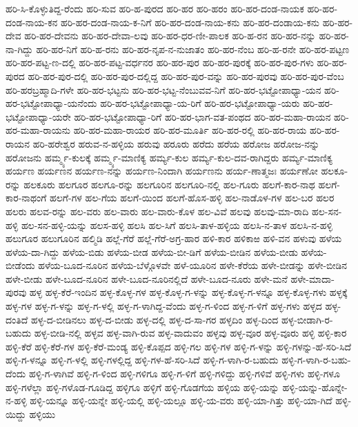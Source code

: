 ಹರಿ-ಸಿ-ಕೊಳ್ಳುತಿದ್ದ-ರೆಂದು
ಹರಿ-ಸುವ
ಹರಿ-ಹ-ಪುರದ
ಹರಿ-ಹರ
ಹರಿ-ಹರಂ
ಹರಿ-ಹರ-ದಂಡ-ನಾಯಕ
ಹರಿ-ಹರ-ದಂಡ-ನಾಯ-ಕನ
ಹರಿ-ಹರ-ದಂಡ-ನಾಯ-ಕ-ನಿಗೆ
ಹರಿ-ಹರ-ದಂಡ-ನಾಯ-ಕನು
ಹರಿ-ಹರ-ದಂಡಾಯ-ಕನು
ಹರಿ-ಹರ-ದೇವ
ಹರಿ-ಹರ-ದೇವನು
ಹರಿ-ಹರ-ದೇವಾ-ಲವು
ಹರಿ-ಹರ-ಧರ-ಣೀ-ಪಾಲಕ
ಹರಿ-ಹ-ರನ
ಹರಿ-ಹರ-ನನ್ನು
ಹರಿ-ಹರ-ನಾ-ಗಿದ್ದು
ಹರಿ-ಹರ-ನಿಗೆ
ಹರಿ-ಹ-ರನು
ಹರಿ-ಹರ-ನೃಪ-ನ-ನುಜಾತಂ
ಹರಿ-ಹರ-ನೆಂಬ
ಹರಿ-ಹ-ರನೇ
ಹರಿ-ಹರ-ಪಟ್ಟಣ
ಹರಿ-ಹರ-ಪಟ್ಟ-ಣ-ದಲ್ಲಿ
ಹರಿ-ಹರ-ಪಟ್ಟ-ವರ್ಧನರ
ಹರಿ-ಹರ-ಪುರ
ಹರಿ-ಹರ-ಪುರಕ್ಕೆ
ಹರಿ-ಹರ-ಪುರ-ಗಳು
ಹರಿ-ಹರ-ಪುರದ
ಹರಿ-ಹರ-ಪುರ-ದಲ್ಲಿ
ಹರಿ-ಹರ-ಪುರ-ದಲ್ಲಿದ್ದ
ಹರಿ-ಹರ-ಪುರ-ವನ್ನು
ಹರಿ-ಹರ-ಪುರವು
ಹರಿ-ಹರ-ಪುರ-ವೆಂಬ
ಹರಿ-ಹರಬ್ರಹ್ಮಾದಿ-ಗಳೇ
ಹರಿ-ಹರ-ಭಟ್ಟನು
ಹರಿ-ಹರ-ಭಟ್ಟ-ನೆಂಬುವವ-ನಿಗೆ
ಹರಿ-ಹರ-ಭಟ್ಟೋಪಾಧ್ಯಾ-ಯನ
ಹರಿ-ಹರ-ಭಟ್ಟೋಪಾಧ್ಯಾ-ಯನೆಂದು
ಹರಿ-ಹರ-ಭಟ್ಟೋಪಾಧ್ಯಾ-ಯ-ರಿಗೆ
ಹರಿ-ಹರ-ಭಟ್ಟೋಪಾಧ್ಯಾ-ಯರು
ಹರಿ-ಹರ-ಭಟ್ಟೋಪಾಧ್ಯಾ-ಯರೇ
ಹರಿ-ಹರ-ಭಟ್ಟೋಪಾಧ್ಯಾ-ರಿಗೆ
ಹರಿ-ಹರ-ಭಾಗ-ವತ-ಪಂಥದ
ಹರಿ-ಹರ-ಮಹಾ-ರಾಯನ
ಹರಿ-ಹರ-ಮಹಾ-ರಾಯನು
ಹರಿ-ಹರ-ಮಹಾ-ರಾಯರ
ಹರಿ-ಹರ-ಮೂರ್ತಿ
ಹರಿ-ಹರ-ರಲ್ಲಿ
ಹರಿ-ಹರ-ರಾಯ
ಹರಿ-ಹರ-ರಾಯನ
ಹರಿ-ಹರೇಶ್ವರ
ಹರುವ-ನ-ಹಳ್ಳಿಯ
ಹರುವು
ಹರೂರು
ಹರೆದು
ಹರೆಯ
ಹರೋಜ
ಹರೋಜ-ನನ್ನು
ಹರೋಜನು
ಹರ್ಮ್ಮ್ಯ-ಕುಲಕ್ಕೆ
ಹರ್ಮ್ಮ್ಯ-ಮಾಣಿಕ್ಯ
ಹರ್ಮ್ಯ-ಕುಲ
ಹರ್ಮ್ಯ-ಕುಲ-ದವ-ರಾಗಿದ್ದರು
ಹರ್ಮ್ಯ-ಮಾಣಿಕ್ಯ
ಹರ್ಯಣ
ಹರ್ಯಣನ
ಹರ್ಯಣ-ನನ್ನು
ಹರ್ಯಣ-ನಿಂದಾಗಿ
ಹರ್ಯಣನು
ಹರ್ಯ-ಣಾತ್ಮಜಃ
ಹರ್ಯಣೋ
ಹಲಕೂ-ರನ್ನು
ಹಲಕೂರು
ಹಲಗೂರ
ಹಲಗೂ-ರನ್ನು
ಹಲಗೂರಿನ
ಹಲಗೂರಿ-ನಲ್ಲಿ
ಹಲ-ಗೂರು
ಹಲಗೆ-ಕಾರ-ನಾಥ
ಹಲಗೆ-ಕಾರ-ನಾಥಂಗೆ
ಹಲಗೆ-ಗಳ
ಹಲ-ಗೆಯ
ಹಲಗೆ-ಯಿಂದ
ಹಲಗೆ-ಹೊಸ-ಹಳ್ಳಿ
ಹಲ-ನಾಡೊಳ-ಗಳ
ಹಲ-ಬರ
ಹಲರ
ಹಲರು
ಹಲವ-ರನ್ನು
ಹಲ-ವರು
ಹಲ-ವಾರು
ಹಲ-ವಾರು-ಕೊಳ
ಹಲ-ವಿವೆ
ಹಲವು
ಹಲವು-ಮಾ-ರಾದಿ
ಹಲ-ಸನ-ಹಳ್ಳಿ
ಹಲ-ಸನ-ಹಳ್ಳಿ-ಯನ್ನು
ಹಲಸ-ಹಳ್ಳಿ
ಹಲಸಿ
ಹಲ-ಸಿಗೆ
ಹಲಸಿ-ತಾಳ-ಹಳ್ಳಿಯ
ಹಲಸಿ-ನ-ತಾಳ
ಹಲಸಿ-ನ-ಹಳ್ಳಿ
ಹಲುಗೂರ
ಹಲುಗೂರಿನ
ಹಲ್ಮಿಡಿ
ಹಲ್ಲೆ-ಗೆರೆ
ಹಲ್ಲೆ-ಗೆರೆ-ಅಗ್ರ-ಹಾರ
ಹಳಿ-ಕಾರ
ಹಳಿಕಾಱ
ಹಳಿ-ವನ
ಹಳುವು
ಹಳೆಯ
ಹಳೆಯ-ದಾ-ಗಿದ್ದು
ಹಳೆಯ-ಬಿಡು
ಹಳೆಯ-ಬೀಡ
ಹಳೆಯ-ಬೀ-ಡಿಗೆ
ಹಳೆಯ-ಬೀಡಿನ
ಹಳೆಯ-ಬೀಡು
ಹಳೆಯ-ಬೀಡೆಂದು
ಹಳೆಯ-ಬೂದ-ನೂರಿನ
ಹಳೆಯ-ಬೆಳ್ಗೊಳವೇ
ಹಳೆ-ಯೂರಿನ
ಹಳೇ-ಕೆರೆಯ
ಹಳೇ-ಬೀಡನ್ನು
ಹಳೇ-ಬೀಡಿನ
ಹಳೇ-ಬೀಡು
ಹಳೇ-ಬೂದ-ನೂರಿನ
ಹಳೇ-ಬೂದ-ನೂರಿನಲ್ಲಿದೆ
ಹಳೇ-ಬೂದ-ನೂರು
ಹಳೇ-ಮನೆ
ಹಳೇ-ಮಾದಾ-ಪುರವು
ಹಳ್ಳ
ಹಳ್ಳ-ಕೆರೆ-ಇಂದಿನ
ಹಳ್ಳ-ಕೊಳ್ಳ-ಗಳ
ಹಳ್ಳ-ಕೊಳ್ಳ-ಗ-ಳನ್ನು
ಹಳ್ಳ-ಕೊಳ್ಳ-ಗ-ಳನ್ನೂ
ಹಳ್ಳ-ಕೊಳ್ಳ-ಗಳು
ಹಳ್ಳಕ್ಕೆ
ಹಳ್ಳ-ಗಳ
ಹಳ್ಳ-ಗ-ಳನ್ನು
ಹಳ್ಳ-ಗ-ಳಲ್ಲಿ
ಹಳ್ಳ-ಗ-ಳಾಗಿದ್ದ-ವೆಂದು
ಹಳ್ಳ-ಗ-ಳಿಂದ
ಹಳ್ಳ-ಗ-ಳಿಗೆ
ಹಳ್ಳ-ಗಳು
ಹಳ್ಳದ
ಹಳ್ಳ-ದಂತಿದೆ
ಹಳ್ಳ-ದ-ಬೀಡಿನಲು
ಹಳ್ಳ-ದ-ಬೀಡು
ಹಳ್ಳ-ದಲ್ಲಿ
ಹಳ್ಳ-ದ-ಸಾ-ಗರ
ಹಳ್ಳದಿಂ
ಹಳ್ಳ-ದಿಂದ
ಹಳ್ಳ-ಬೀಡಾಗಿ-ರ-ಬಹುದು
ಹಳ್ಳ-ಬೀಡಿ-ನಲ್ಲಿ
ಹಳ್ಳವ
ಹಳ್ಳ-ವಾಗಿ-ರುವ
ಹಳ್ಳ-ವಾದುವಂ
ಹಳ್ಳವು
ಹಳ್ಳ-ವೂರ
ಹಳ್ಳ-ವೂರು
ಹಳ್ಳಿ
ಹಳ್ಳಿ-ಕಾರ
ಹಳ್ಳಿ-ಕೆರೆ
ಹಳ್ಳಿ-ಕೆರೆ-ಗಳ
ಹಳ್ಳಿ-ಕೆರೆ-ಮಂಡ್ಯ
ಹಳ್ಳಿ-ಕೊಪ್ಪದ
ಹಳ್ಳಿ-ಗಲ
ಹಳ್ಳಿ-ಗಳ
ಹಳ್ಳಿ-ಗ-ಳನ್ನು
ಹಳ್ಳಿ-ಗಳನ್ನು-ಹೆ-ಸರಿ-ಸಿದೆ
ಹಳ್ಳಿ-ಗ-ಳನ್ನೂ
ಹಳ್ಳಿ-ಗ-ಳಲ್ಲಿ
ಹಳ್ಳಿ-ಗಳಲ್ಲಿದ್ದ
ಹಳ್ಳಿ-ಗಳ-ಹೆ-ಸರಿ-ಸಿದೆ
ಹಳ್ಳಿ-ಗ-ಳಾಗಿ-ರ-ಬಹುದು
ಹಳ್ಳಿ-ಗ-ಳಾಗಿ-ರ-ಬಹು-ದೆಂದು
ಹಳ್ಳಿ-ಗ-ಳಾಗಿವೆ
ಹಳ್ಳಿ-ಗ-ಳಿಂದ
ಹಳ್ಳಿ-ಗಳಿಗೂ
ಹಳ್ಳಿ-ಗ-ಳಿಗೆ
ಹಳ್ಳಿ-ಗಳಿದ್ದು
ಹಳ್ಳಿ-ಗಳಿವೆ
ಹಳ್ಳಿ-ಗಳು
ಹಳ್ಳಿ-ಗಳೂ
ಹಳ್ಳಿ-ಗಳೆಲ್ಲಾ
ಹಳ್ಳಿ-ಗಳೊಡ-ಗೂಡಿದ್ದ
ಹಳ್ಳಿಗೂ
ಹಳ್ಳಿಗೆ
ಹಳ್ಳಿ-ಗೊಡಗೆಯ
ಹಳ್ಳಿಯ
ಹಳ್ಳಿ-ಯನ್ನು
ಹಳ್ಳಿ-ಯನ್ನು-ಹೊನ್ನೇ-ನ-ಹಳ್ಳಿ
ಹಳ್ಳಿ-ಯನ್ನೂ
ಹಳ್ಳಿ-ಯನ್ನೇ
ಹಳ್ಳಿ-ಯಲ್ಲಿ
ಹಳ್ಳಿ-ಯಲ್ಲೂ
ಹಳ್ಳಿ-ಯ-ವರು
ಹಳ್ಳಿ-ಯಾ-ಗಿತ್ತು
ಹಳ್ಳಿ-ಯಾ-ಗಿದೆ
ಹಳ್ಳಿ-ಯಿದ್ದು
ಹಳ್ಳಿಯು
